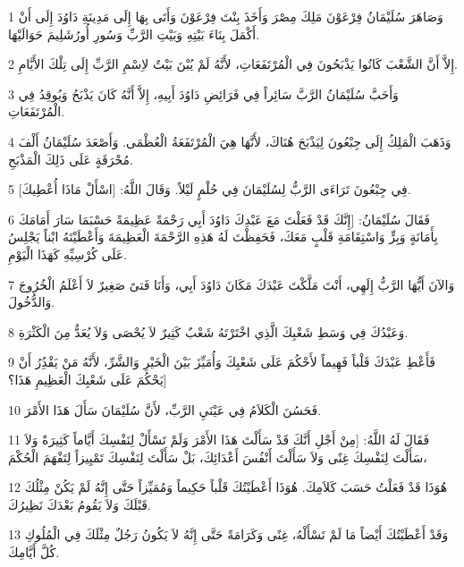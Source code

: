 \par 1 وَصَاهَرَ سُلَيْمَانُ فِرْعَوْنَ مَلِكَ مِصْرَ وَأَخَذَ بِنْتَ فِرْعَوْنَ وَأَتَى بِهَا إِلَى مَدِينَةِ دَاوُدَ إِلَى أَنْ أَكْمَلَ بِنَاءَ بَيْتِهِ وَبَيْتِ الرَّبِّ وَسُورِ أُورُشَلِيمَ حَوَالَيْهَا.
\par 2 إِلاَّ أَنَّ الشَّعْبَ كَانُوا يَذْبَحُونَ فِي الْمُرْتَفَعَاتِ، لأَنَّهُ لَمْ يُبْنَ بَيْتٌ لاِسْمِ الرَّبِّ إِلَى تِلْكَ الأَيَّامِ.
\par 3 وَأَحَبَّ سُلَيْمَانُ الرَّبَّ سَائِراً فِي فَرَائِضِ دَاوُدَ أَبِيهِ، إِلاَّ أَنَّهُ كَانَ يَذْبَحُ وَيُوقِدُ فِي الْمُرْتَفَعَاتِ.
\par 4 وَذَهَبَ الْمَلِكُ إِلَى جِبْعُونَ لِيَذْبَحَ هُنَاكَ، لأَنَّهَا هِيَ الْمُرْتَفَعَةُ الْعُظْمَى. وَأَصْعَدَ سُلَيْمَانُ أَلْفَ مُحْرَقَةٍ عَلَى ذَلِكَ الْمَذْبَحِ.
\par 5 فِي جِبْعُونَ تَرَاءَى الرَّبُّ لِسُلَيْمَانَ فِي حُلْمٍ لَيْلاً. وَقَالَ اللَّهُ: [اسْأَلْ مَاذَا أُعْطِيكَ].
\par 6 فَقَالَ سُلَيْمَانُ: [إِنَّكَ قَدْ فَعَلْتَ مَعَ عَبْدِكَ دَاوُدَ أَبِي رَحْمَةً عَظِيمَةً حَسْبَمَا سَارَ أَمَامَكَ بِأَمَانَةٍ وَبِرٍّ وَاسْتِقَامَةِ قَلْبٍ مَعَكَ، فَحَفِظْتَ لَهُ هَذِهِ الرَّحْمَةَ الْعَظِيمَةَ وَأَعْطَيْتَهُ ابْناً يَجْلِسُ عَلَى كُرْسِيِّهِ كَهَذَا الْيَوْمِ.
\par 7 وَالآنَ أَيُّهَا الرَّبُّ إِلَهِي، أَنْتَ مَلَّكْتَ عَبْدَكَ مَكَانَ دَاوُدَ أَبِي، وَأَنَا فَتىً صَغِيرٌ لاَ أَعْلَمُ الْخُرُوجَ وَالدُّخُولَ.
\par 8 وَعَبْدُكَ فِي وَسَطِ شَعْبِكَ الَّذِي اخْتَرْتَهُ شَعْبٌ كَثِيرٌ لاَ يُحْصَى وَلاَ يُعَدُّ مِنَ الْكَثْرَةِ.
\par 9 فَأَعْطِ عَبْدَكَ قَلْباً فَهِيماً لأَحْكُمَ عَلَى شَعْبِكَ وَأُمَيِّزَ بَيْنَ الْخَيْرِ وَالشَّرِّ، لأَنَّهُ مَنْ يَقْدُِرُ أَنْ يَحْكُمَ عَلَى شَعْبِكَ الْعَظِيمِ هَذَا؟]
\par 10 فَحَسُنَ الْكَلاَمُ فِي عَيْنَيِ الرَّبِّ، لأَنَّ سُلَيْمَانَ سَأَلَ هَذَا الأَمْرَ.
\par 11 فَقَالَ لَهُ اللَّهُ: [مِنْ أَجْلِ أَنَّكَ قَدْ سَأَلْتَ هَذَا الأَمْرَ وَلَمْ تَسْأَلْ لِنَفْسِكَ أَيَّاماً كَثِيرَةً وَلاَ سَأَلْتَ لِنَفْسِكَ غِنًى وَلاَ سَأَلْتَ أَنْفُسَ أَعْدَائِكَ، بَلْ سَأَلْتَ لِنَفْسِكَ تَمْيِيزاً لِتَفْهَمَ الْحُكْمَ،
\par 12 هُوَذَا قَدْ فَعَلْتُ حَسَبَ كَلاَمِكَ. هُوَذَا أَعْطَيْتُكَ قَلْباً حَكِيماً وَمُمَيِّزاً حَتَّى إِنَّهُ لَمْ يَكُنْ مِثْلُكَ قَبْلَكَ وَلاَ يَقُومُ بَعْدَكَ نَظِيرُكَ.
\par 13 وَقَدْ أَعْطَيْتُكَ أَيْضاً مَا لَمْ تَسْأَلْهُ، غِنًى وَكَرَامَةً حَتَّى إِنَّهُ لاَ يَكُونُ رَجُلٌ مِثْلَكَ فِي الْمُلُوكِ كُلَّ أَيَّامِكَ.
